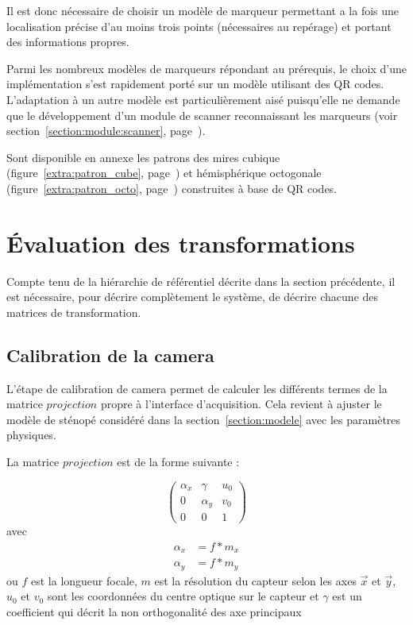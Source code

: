 \documentclass[10pt,a4paper,twoside, twocolumn]{report}
\begin{document}
Il est donc nécessaire de choisir un modèle de marqueur permettant a la fois une localisation précise d'au moins trois points (nécessaires au repérage) et portant des informations propres.

Parmi les nombreux modèles de marqueurs répondant au prérequis, le choix d'une implémentation s'est rapidement porté sur un modèle utilisant des QR codes. L'adaptation à un autre modèle est particulièrement aisé puisqu'elle ne demande que le développement d'un module de scanner reconnaissant les marqueurs (voir section~\ref{section:module:scanner}, page~\pageref{section:module:scanner}).

Sont disponible en annexe les patrons des mires cubique (figure~\ref{extra:patron_cube}, page~\pageref{extra:patron_cube}) et hémisphérique octogonale (figure~\ref{extra:patron_octo}, page~\pageref{extra:patron_octo}) construites à base de QR codes.



\section{Évaluation des transformations}

Compte tenu de la hiérarchie de référentiel décrite dans la section précédente, il est nécessaire, pour décrire complètement le système, de décrire chacune des matrices de transformation. 


\subsection{Calibration de la camera}

L'étape de calibration de camera permet de calculer les différents termes de la matrice $projection$ propre à l'interface d'acquisition. Cela revient à ajuster le modèle de sténopé considéré dans la section~\ref{section:modele} avec les paramètres physiques.

La matrice $projection$ est de la forme suivante :

\begin{equation}
	\begin{pmatrix}
		\alpha_x	&	\gamma		& u_0	\\
		0					&	\alpha_y	&	v_0	\\
		0					&	0					&	1
	\end{pmatrix}
\end{equation}
avec 
\begin{align*}
	\alpha_x	&= f * m_x	\\
	\alpha_y	&= f * m_y
\end{align*}
ou $f$ est la longueur focale, $m$ est la résolution du capteur selon les axes $\vec x$ et $\vec y$, $u_0$ et $v_0$ sont les coordonnées du centre optique sur le capteur et $\gamma$ est un coefficient qui décrit la non orthogonalité des axe principaux
\end{document}
